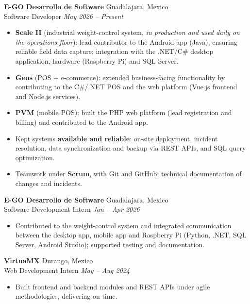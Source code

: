 \documentclass[11pt,a4paper]{article}
\newcommand{\entry}[4]{%
  \textbf{#1} \hfill {\color{muted}#2}\\[1pt]
  {\color{accent}#3} \hfill {\color{muted}\itshape #4}\\[3pt]
}
\begin{document}
\entry{E-GO Desarrollo de Software}{Guadalajara, Mexico}{Software Developer}{May 2026 -- Present}
\begin{itemize}
  \item \textbf{Scale II} (industrial weight-control system, \textit{in production and used daily on the operations floor}):
        lead contributor to the Android app (Java), ensuring reliable field data capture; integration with the .NET/C\#
        desktop application, hardware (Raspberry Pi) and SQL Server.
  \item \textbf{Gens} (POS + e-commerce): extended business-facing functionality by contributing to the C\#/.NET POS and
        the web platform (Vue.js frontend and Node.js services).
  \item \textbf{PVM} (mobile POS): built the PHP web platform (lead registration and billing) and contributed to the
        Android app.
  \item Kept systems \textbf{available and reliable}: on-site deployment, incident resolution, data synchronization and
        backup via REST APIs, and SQL query optimization.
  \item Teamwork under \textbf{Scrum}, with Git and GitHub; technical documentation of changes and incidents.
\end{itemize}

\entry{E-GO Desarrollo de Software}{Guadalajara, Mexico}{Software Development Intern}{Jan -- Apr 2026}
\begin{itemize}
  \item Contributed to the weight-control system and integrated communication between the desktop app, mobile app and
        Raspberry Pi (Python, .NET, SQL Server, Android Studio); supported testing and documentation.
\end{itemize}

\entry{VirtuaMX}{Durango, Mexico}{Web Development Intern}{May -- Aug 2024}
\begin{itemize}
  \item Built frontend and backend modules and REST APIs under agile methodologies, delivering on time.
\end{itemize}

\end{document}
